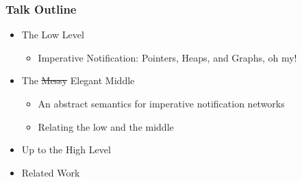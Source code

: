\documentclass[svgnames]{beamer}
\begin{document}
\begin{frame}
  \frametitle{Talk Outline}
  \begin{itemize}
    \item The Low Level 
      \begin{itemize}
        \item Imperative Notification: Pointers, Heaps, and Graphs, oh my!
      \end{itemize}
    \item The \sout{Messy} Elegant Middle
      \begin{itemize}
        \item An abstract semantics for imperative notification networks
        \item Relating the low and the middle
      \end{itemize}
    \item Up to the High Level    \item Related Work
  \end{itemize}
\end{frame}
\end{document}
